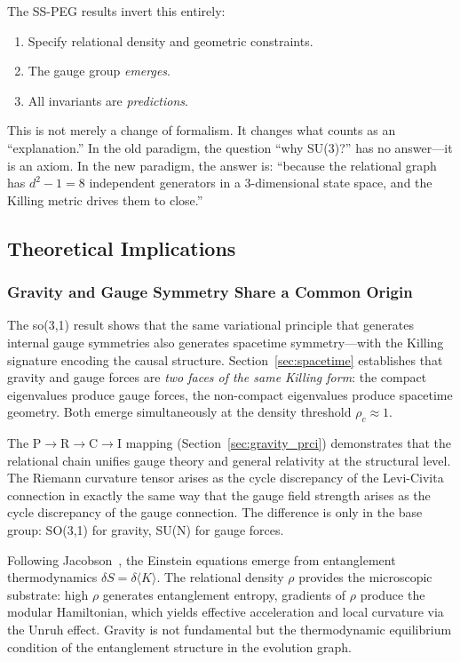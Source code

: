 The SS-PEG results invert this entirely:

\begin{enumerate}
\item Specify relational density and geometric constraints.
\item The gauge group \textit{emerges}.
\item All invariants are \textit{predictions}.
\end{enumerate}

This is not merely a change of formalism. It changes what counts as an ``explanation.'' In the old paradigm, the question ``why SU(3)?'' has no answer---it is an axiom. In the new paradigm, the answer is: ``because the relational graph has $d^2 - 1 = 8$ independent generators in a 3-dimensional state space, and the Killing metric drives them to close.''

\subsection{Theoretical Implications}\label{sec:implications}

\subsubsection{Gravity and Gauge Symmetry Share a Common Origin}

The so(3,1) result shows that the same variational principle that generates internal gauge symmetries also generates spacetime symmetry---with the Killing signature encoding the causal structure. Section~\ref{sec:spacetime} establishes that gravity and gauge forces are \textit{two faces of the same Killing form}: the compact eigenvalues produce gauge forces, the non-compact eigenvalues produce spacetime geometry. Both emerge simultaneously at the density threshold $\rho_c \approx 1$.

The P$\to$R$\to$C$\to$I mapping (Section~\ref{sec:gravity_prci}) demonstrates that the relational chain unifies gauge theory and general relativity at the structural level. The Riemann curvature tensor arises as the cycle discrepancy of the Levi-Civita connection in exactly the same way that the gauge field strength arises as the cycle discrepancy of the gauge connection. The difference is only in the base group: SO(3,1) for gravity, SU(N) for gauge forces.

Following Jacobson~\cite{Jacobson1995,Jacobson1998}, the Einstein equations emerge from entanglement thermodynamics $\delta S = \delta\langle K \rangle$. The relational density $\rho$ provides the microscopic substrate: high $\rho$ generates entanglement entropy, gradients of $\rho$ produce the modular Hamiltonian, which yields effective acceleration and local curvature via the Unruh effect. Gravity is not fundamental but the thermodynamic equilibrium condition of the entanglement structure in the evolution graph.

